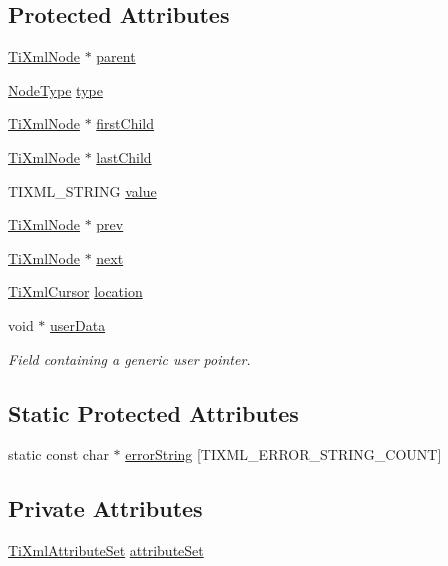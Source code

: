 \subsection*{Protected Attributes}
\begin{DoxyCompactItemize}
\item 
\hyperlink{classTiXmlNode}{TiXmlNode} $\ast$ \hyperlink{classTiXmlNode_a662c4de61244e4fa5bd4e2d8c63143a5}{parent}
\item 
\hyperlink{classTiXmlNode_a836eded4920ab9e9ef28496f48cd95a2}{NodeType} \hyperlink{classTiXmlNode_a2619c6379181c16ba95ae6922e2ca839}{type}
\item 
\hyperlink{classTiXmlNode}{TiXmlNode} $\ast$ \hyperlink{classTiXmlNode_af749fb7f22010b80e8f904c32653d50e}{firstChild}
\item 
\hyperlink{classTiXmlNode}{TiXmlNode} $\ast$ \hyperlink{classTiXmlNode_a5b30756d21b304580d22a841ec9d61f8}{lastChild}
\item 
TIXML\_\-STRING \hyperlink{classTiXmlNode_aead528b3cedc33c16a6c539872c7cc8b}{value}
\item 
\hyperlink{classTiXmlNode}{TiXmlNode} $\ast$ \hyperlink{classTiXmlNode_a9c5370ea2cbfd9f0e0f7b30a57fd68f5}{prev}
\item 
\hyperlink{classTiXmlNode}{TiXmlNode} $\ast$ \hyperlink{classTiXmlNode_a2f329cc993d2d34df76e17dcbb776b45}{next}
\item 
\hyperlink{structTiXmlCursor}{TiXmlCursor} \hyperlink{classTiXmlBase_a0d992580f3bc264909f898e942677a3c}{location}
\item 
void $\ast$ \hyperlink{classTiXmlBase_ab242c01590191f644569fa89a080d97c}{userData}
\begin{DoxyCompactList}\small\item\em Field containing a generic user pointer. \item\end{DoxyCompactList}\end{DoxyCompactItemize}
\subsection*{Static Protected Attributes}
\begin{DoxyCompactItemize}
\item 
static const char $\ast$ \hyperlink{classTiXmlBase_a7ac8feec4100e446b3d78e1ac0659700}{errorString} \mbox{[}TIXML\_\-ERROR\_\-STRING\_\-COUNT\mbox{]}
\end{DoxyCompactItemize}
\subsection*{Private Attributes}
\begin{DoxyCompactItemize}
\item 
\hyperlink{classTiXmlAttributeSet}{TiXmlAttributeSet} \hyperlink{classTiXmlElement_a56d7e69380c3cc938bf213d2857791b2}{attributeSet}
\end{DoxyCompactItemize}


